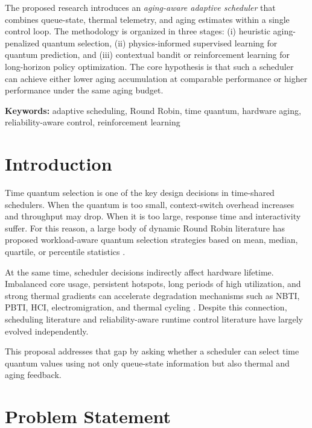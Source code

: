 \documentclass[12pt,a4paper]{article}
\begin{document}
The proposed research introduces an \textit{aging-aware adaptive scheduler} that combines queue-state,
thermal telemetry, and aging estimates within a single control loop. The methodology is organized in
three stages: (i) heuristic aging-penalized quantum selection, (ii) physics-informed supervised learning
for quantum prediction, and (iii) contextual bandit or reinforcement learning for long-horizon policy
optimization. The core hypothesis is that such a scheduler can achieve either lower aging accumulation
at comparable performance or higher performance under the same aging budget.

\textbf{Keywords:} adaptive scheduling, Round Robin, time quantum, hardware aging,\\ reliability-aware control, reinforcement learning

\newpage
{}
\onehalfspacing

\section{Introduction}

Time quantum selection is one of the key design decisions in time-shared schedulers. When the quantum is
too small, context-switch overhead increases and throughput may drop. When it is too large, response time
and interactivity suffer. For this reason, a large body of dynamic Round Robin literature has proposed
workload-aware quantum selection strategies based on mean, median, quartile, or percentile statistics
\cite{behera2010,noon2011,marr2022,zohora2024}.

At the same time, scheduler decisions indirectly affect hardware lifetime. Imbalanced core usage, persistent
hotspots, long periods of high utilization, and strong thermal gradients can accelerate degradation mechanisms
such as NBTI, PBTI, HCI, electromigration, and thermal cycling \cite{srinivasan2004,agarwal2007,kumar2011}.
Despite this connection, scheduling literature and reliability-aware runtime control literature have largely
evolved independently.

This proposal addresses that gap by asking whether a scheduler can select time quantum values using not only
queue-state information but also thermal and aging feedback.

\section{Problem Statement}
\end{document}
